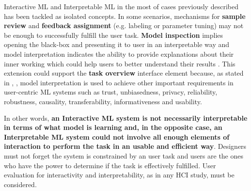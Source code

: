 Interactive ML and Interpretable ML in the most of cases previously described has been tackled as isolated concepts. In some scenarios, mechanisms for \textbf{sample review} and \textbf{feedback assignment} (e.g. labeling or parameter tuning) may not be enough to successfully fulfill the user task. \textbf{Model inspection} implies opening the black-box and presenting it to user in an interpretable way and model interpretation indicates the ability to provide explanations about their inner working which could help users to better understand their results \cite{Doshi-Velez2017c}. This extension could support the \textbf{task overview} interface element because, as stated in \cite{Doshi-Velez2017c}, \cite{Lipton2017}, model interpretation is used to achieve other important requirements in user-centric ML systems such as trust, unbiasedness, privacy, reliability, robustness, causality, transferability, informativeness and usability.

In other words, \textbf{an Interactive ML system is not necessarily interpretable in terms of what model is learning and, in the opposite case, an Interpretable ML system could not involve all enough elements of interaction to perform the task in an usable and efficient way}. Designers must not forget the system is constrained by an user task and users are the ones who have the power to determine if the task is effectively fulfilled. User evaluation for interactivity and interpretability, as in any HCI study, must be considered.



